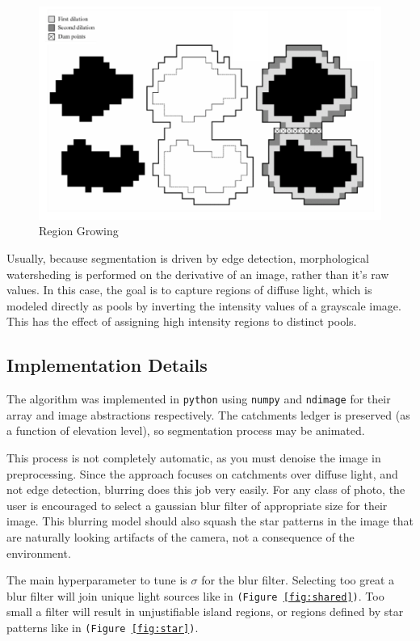 \documentclass[11pt,twocolumn]{article} %
\def\python{\texttt{python}\xspace}
\def\np{\texttt{numpy}\xspace}
\def\ndimage{\texttt{ndimage}\xspace}
\begin{document}
\begin{figure}
  \includegraphics[width=\columnwidth]{./images/algorithm/regions.png}
  \caption{Region Growing}
  \label{fig:regions}
\end{figure}

Usually, because segmentation is driven by edge detection, morphological watersheding is performed on the derivative of an image, rather than it's raw values. In this case, the goal is to capture regions of diffuse light, which is modeled directly as pools by inverting the intensity values of a grayscale image. This has the effect of assigning high intensity regions to distinct pools.

\subsection{Implementation Details}
The algorithm was implemented in \python using \np and \ndimage for their array and image abstractions respectively. The catchments ledger is preserved (as a function of elevation level), so segmentation process may be animated.

This process is not completely automatic, as you must denoise the image in preprocessing. Since the approach focuses on catchments over diffuse light, and not edge detection, blurring does this job very easily. For any class of photo, the user is encouraged to select a gaussian blur filter of appropriate size for their image. This blurring model should also squash the star patterns in the image that are naturally looking artifacts of the camera, not a consequence of the environment.

The main hyperparameter to tune is $\sigma$ for the blur filter. Selecting too great a blur filter will join unique light sources like in \texttt{(Figure~\ref{fig:shared})}. Too small a filter will result in unjustifiable island regions, or regions defined by star patterns like in \texttt{(Figure~\ref{fig:star})}.
\end{document}
